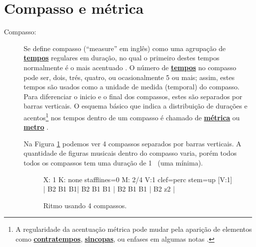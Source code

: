 \section{Compasso e métrica}
\label{sec:compaso}



\begin{description}
\item[Compasso:] \label{def:Compasso} Se define compasso (``measure'' em inglês)
como uma agrupação de \hyperref[sec:Tempo]{\textbf{tempos}} regulares em duração,
no qual o primeiro destes tempos normalmente é o mais acentuado \cite[pp. 513]{apel1969harvard}. 
O número de \hyperref[sec:Tempo]{\textbf{tempos}} no compasso pode ser, dois, trés, quatro, ou ocasionalmente 5 ou mais;
assim, estes tempos são usados como a unidade de medida (temporal) do compasso.
Para diferenciar o inicio e o final dos compassos, 
estes são separados por barras verticais. 
O esquema básico que indica a distribuição de durações e 
acentos\footnote{\label{ref:outroacento}A regularidade da acentuação métrica pode mudar pela aparição de elementos como \hyperref[sec:contratempo]{\textbf{contratempos}}, 
\hyperref[sec:sincope]{\textbf{sincopas}}, ou enfases em algumas notas \cite[pp. 513]{apel1969harvard}.} 
nos tempos dentro de um compasso é chamado de \hyperref[def:Metrica]{\textbf{métrica}}  ou \hyperref[def:Metrica]{\textbf{metro}} \cite[pp. 513]{apel1969harvard}.
\begin{example}
Na Figura \ref{fig:abc-exemplocompasso1} podemos ver 4 compassos separados por barras verticais.
A quantidade de figuras musicais dentro do compasso varia, 
porém todos todos os compassos tem uma duração de  1 \Halb~(uma mínima).
\end{example}
 
\begin{figure}[h]
\centering
\begin{abc}[name=abc-exemplocompasso1]
%
X: 1 %
K: none stafflines=0 %
M: 2/4
V:1 clef=perc stem=up %
%
[V:1] | B2 B1 B1| B2 B1 B1 | B2 B1 B1 | B2 z2  |
%       
\end{abc}
\caption{Ritmo usando 4 compassos.}
\label{fig:abc-exemplocompasso1}
\end{figure}


\end{description}
